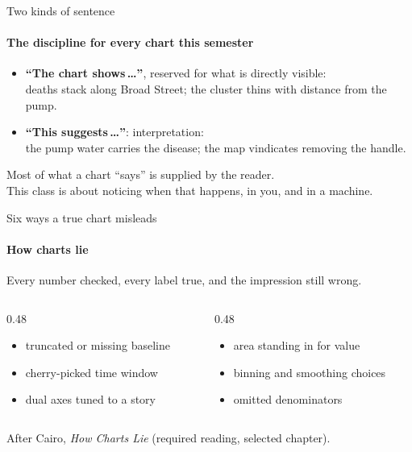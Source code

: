 \documentclass[aspectratio=169,11pt]{beamer}
\newcommand{\credit}[1]{{\color{creditcolor}\tiny #1}}
\begin{document}
\begin{frame}{Two kinds of sentence}\framesubtitle{The discipline for every chart this semester}
  \begin{itemize}
    \item \textbf{``The chart shows\,\dots''}, reserved for what is directly visible:\\
          deaths stack along Broad Street; the cluster thins with distance from the pump.
    \item \textbf{``This suggests\,\dots''}: interpretation:\\
          the pump water carries the disease; the map vindicates removing the handle.
  \end{itemize}
  \vspace{1em}
  Most of what a chart ``says'' is supplied by the reader.\\
  This class is about noticing when that happens, in you, and in a machine.
\end{frame}

\begin{frame}{Six ways a true chart misleads}\framesubtitle{How charts lie}
  Every number checked, every label true, and the impression still wrong.
  \begin{columns}[T]
    \begin{column}{0.48\textwidth}
      \begin{itemize}
        \item truncated or missing baseline
        \item cherry-picked time window
        \item dual axes tuned to a story
      \end{itemize}
    \end{column}
    \begin{column}{0.48\textwidth}
      \begin{itemize}
        \item area standing in for value
        \item binning and smoothing choices
        \item omitted denominators
      \end{itemize}
    \end{column}
  \end{columns}
  \vspace{0.8em}
  \credit{After Cairo, \emph{How Charts Lie} (required reading, selected chapter).}
\end{frame}
\end{document}
